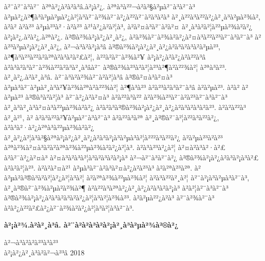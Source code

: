 à²¨à²¨à³à²¨ à²ªà²¿à²à²à³â.à²¡à²¿. à²ªà³à²²¬à²à²§à²µà²¨à³à²¨à³ à²µà²¿à²¶à³à²µà²µà²¿à²¦à³à²¯à²¾à²¨à²¿à²²à²¯à²à³à²à³ à²¸à²²à³à²²à²¿à²¸à³à²µà²¾à², à²à² à²à²³ à²µà²³à²·à²à²³ à²¹à²¿à²à²¦à³, à²à²¤à³à²¯à²à²¤ à²¸à³à²à²¦à²²µà²¾à²à²¿ à²¡à²¿.à²à²¿.à²ªà²¿. à²®à²¾à²¡à²¿à²¸à²¿, à²à²¾à²¯à²¾à²à²¿à²¤à³à²²à²³à²¨à³à²¨à³ à²à²³à²µà²¡à²¿à²¸à²¿, à²¬à³à²à²¡à³â à²®à²¾à²¡à²¿à²¸à²¿à²à³à²à³à²à²µà²³, à²¶à³à²³à²²à²à²ªà²à³à²à²£à²¦, à²²à²à²¨à²¾à²¥ à²¡à²¿à²à²¿à²à²²à³â à²à³à²à³à²¨à²¾à²²à²à³à²¸à³âà²¨ à²®à²¾à²³à²à²¦à²³à²¶à²à²²¾à²¦ à²ªà³à²³. à²¸à²¿.à²à²¸à³â. à²¯à³à²à²¾à²¨à²à²¦à³â à²®à²¤à³à²¤à³ à²µà³à²¯à²µà²¸à³à²¥à²¾à²ªà²à²²¾à²¦ à²¶à³à²³ à²à²³à²à³à²¨à³â à²à²µà²³. à²à² à²à²µà²³ à²®à³à²à²¦à³ à²¨à²¿à²à²¤à³ à²à²²à³à²² à²à²¾à²³à²¯à²à²³à²¨à³à²¨à³ à²¸à³à²¸à³à²¤à³à²²µà²¾à²à²¿ à²à²à³à²®à²¾à²¡à²¿à²¸à²¿à²à³à²à³à²à²³. à²à²à²²à³ à²¸à²¹, à² à²à³à²²à²¥à²µà²¨à³à²¨à³ à²à²²à³à²ª à²¸à²®à²¯à²¦à²²à³à²²à²¿, à²à³à²·à²¿à²ªà³à²²µà²¾à²à²¿ à²¸à²¿à²¦à³à²§à²ªà²¡à²¿à²¸à²¿à²à³à²¡à³à²µà³à²¦à²²²à³à²²à²¿ à²à²µà²³à²à²³ à²ªà²¾à²¤à³à²\circ à²à²ªà²¾à²²µà²¾à²à²¿à²¦à³. à²à³à²³à²¿à²¦ à²¤à²à³à²·à²£ à²à²¯à²¿à²¤à³ à²¤à³à²à³à²¦à³à²à³à²à²¡à³ à²¬à²¨à³à²¨à²¿ à²®à²¾à²¡à²¿à²à³à²¡à³à²£ à²à²à²¦à²³. à²à²à²¤à²¹ à²µà³à²¯à²à³à²¤à²¿à²à²³à³ à²à²ªà²³à²ª. à²à²µà²\circ à²®à³à²à²¦à²¿à²¦à³à²¦ à²à²ªà²¾à²²µà²¾à²¦ à²à³à²²à²¸à²¦ à²¨à²¡à³à²µà³à²¯à³, à²¸à²®à²¯à²¾à²µà²à²¾à²¶ à²à²²à³à²ªà²¿à²¸à²¿à²à³à²à²¡à³ à²à²¦à²¨à³à²¨à³ à²®à²¾à²¡à²¿à²à³à²à³à²à²¿à²¦à³à²¦à²¾à²³. à²à²µà²²¿à²à³ à²¨à²¾à²¨à³ à²à²¿à²²à²£à²¿à²¯à²¾à²à²¿à²¦à³à²¦à³à²¨à³.

\begin{flushright}
\textbf{à²¡à²¾.à²à²¸à³â. à²¨à²à²à³à²à²¡à²¸à³à²µà²¾à²®à²¿}
\end{flushright}

à²¬à³à²à²à²³à³à²³ \\ à²¡à²¿à²¸à³à²à²¬à²³â 2018

